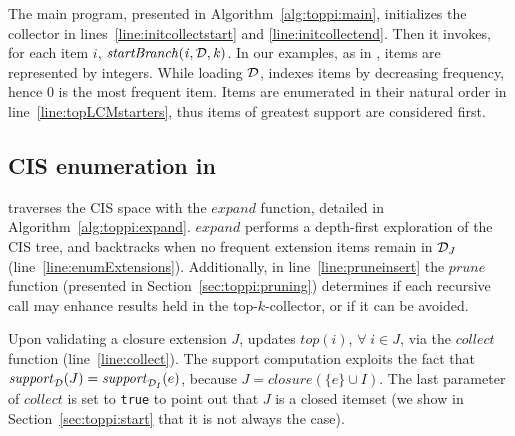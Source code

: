 

The main program, presented in Algorithm~\ref{alg:toppi:main},
initializes the collector in lines~\ref{line:initcollectstart} and \ref{line:initcollectend}.
Then it invokes, for each item $i$,
$\mathit{startBranch(i, {\cal D}, k)}$.
In our examples, as in \toppi, items are represented by integers.
While loading $\cal D$, \toppi indexes items by decreasing frequency,
hence 0 is the most frequent item.
Items are enumerated in their natural order in line~\ref{line:topLCMstarters},
thus items of greatest support are considered first.








\subsection{CIS enumeration in \toppi}
\label{sec:toppi:expand}



\toppi traverses the CIS space with the $\mathit{expand}$ function,
detailed in Algorithm~\ref{alg:toppi:expand}.
$\mathit{expand}$ performs a depth-first exploration of the CIS tree,
and backtracks when no frequent extension items remain in ${\cal D}_J$ (line~\ref{line:enumExtensions}).
Additionally, in line~\ref{line:pruneinsert}
the $\mathit{prune}$ function (presented in Section~\ref{sec:toppi:pruning})
determines if each recursive call may enhance results held in the top-$k$-collector,
or if it can be avoided.

Upon validating a closure extension $J$,
\toppi updates $\mathit{top(i)}$, $\forall\;i\in J$,
via the $\mathit{collect}$ function (line~\ref{line:collect}).
The support computation exploits the fact that $\mathit{support}_{\cal D}(J) = \mathit{support}_{{\cal D}_I}(e)$,
because $J = \mathit{closure}(\{e\}\cup I)$.
The last parameter of $\mathit{collect}$ is set to \verb|true| to point out that $J$ is a closed itemset
(we show in Section~\ref{sec:toppi:start} that it is not always the case).


